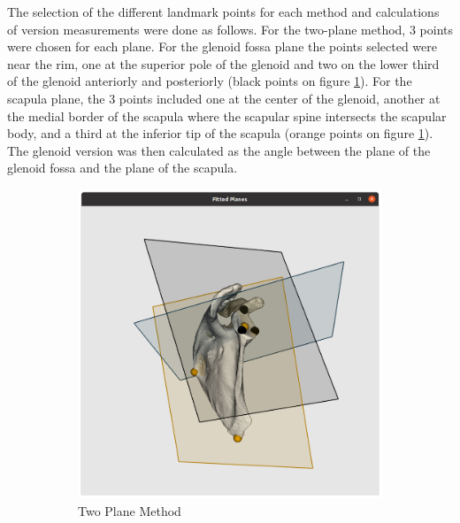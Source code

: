 The selection of the different landmark points for each method and calculations of version measurements were done as follows. For the two-plane method, 3 points were chosen for each plane. For the glenoid fossa plane the points selected were near the rim, one at the superior pole of the glenoid and two on the lower third of the glenoid anteriorly and posteriorly (black points on figure \ref{fig:visplanes}).  For the scapula plane, the 3 points included one at the center of the glenoid, another at the medial border of the scapula where the scapular spine intersects the scapular body, and a third at the inferior tip of the scapula (orange points on figure \ref{fig:visplanes}). The glenoid version was then calculated as the angle between the plane of the glenoid fossa and the plane of the scapula. 

\begin{figure}
        \begin{center}
                \begin{subfigure}[b]{0.31\linewidth}
			\includegraphics[width=\linewidth]{figures/planes_vis.png}
			\caption{\label{fig:visplanes}Two Plane Method}
		\end{subfigure}	
                \begin{subfigure}[b]{0.28\linewidth}

\end{subfigure}
\end{center}
\end{figure}
